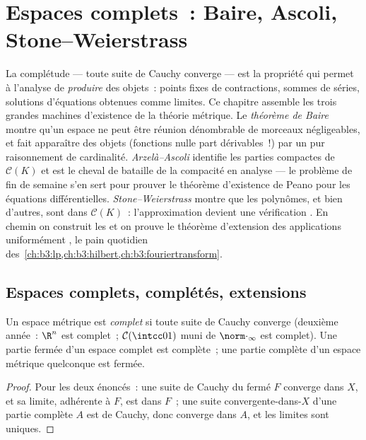 \chapter{Espaces complets~: Baire, Ascoli, Stone--Weierstrass}
\label{ch:b3:complete}

La complétude --- toute suite de Cauchy converge --- est la
propriété qui permet à l'analyse de \emph{produire} des
objets~: points fixes de contractions, sommes de séries,
solutions d'équations obtenues comme limites. Ce chapitre
assemble les trois grandes machines d'existence de la théorie
métrique. Le \emph{théorème de Baire} montre qu'un espace
 ne peut être réunion dénombrable de morceaux
négligeables, et fait apparaître des objets (fonctions 
nulle part dérivables~!) par un pur raisonnement de cardinalité.
\emph{Arzelà--Ascoli} identifie les parties compactes de
$\mathcal C(K)$ et est le cheval de bataille de la compacité en
analyse --- le problème de fin de semaine s'en sert pour prouver
le théorème d'existence de Peano pour les équations
différentielles. \emph{Stone--Weierstrass} montre que les
polynômes, et bien d'autres, sont  dans $\mathcal C(K)$~:
l'approximation devient une vérification . En chemin
on construit les  et on prouve le théorème
d'extension des applications uniformément , le pain
quotidien des~\cref{ch:b3:lp,ch:b3:hilbert,ch:b3:fouriertransform}.

\section{Espaces complets, complétés, extensions}

\begin{definition}\label{def:b3:complete:complete}
Un espace métrique est \emph{complet} si toute suite de Cauchy converge (deuxième année~:
$\R^n$ est complet~; $\mathcal C(\intcc01)$ muni de
$\norm\cdot_\infty$ est complet). Une partie fermée d'un
espace complet est complète~; une partie complète d'un espace
métrique quelconque est fermée.
\end{definition}

\begin{proof}
Pour les deux énoncés~: une suite de Cauchy du fermé $F$
converge dans $X$, et sa limite, adhérente à $F$, est dans
$F$~; une suite convergente-dans-$X$ d'une partie complète $A$
est de Cauchy, donc converge dans $A$, et les limites sont
uniques.
\end{proof}

